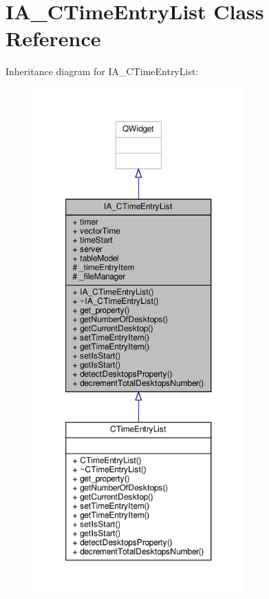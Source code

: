 \hypertarget{classIA__CTimeEntryList}{}\section{I\+A\+\_\+\+C\+Time\+Entry\+List Class Reference}
\label{classIA__CTimeEntryList}


Inheritance diagram for I\+A\+\_\+\+C\+Time\+Entry\+List\+:
\nopagebreak
\begin{figure}[H]
\begin{center}
\leavevmode
\includegraphics[height=550pt]{classIA__CTimeEntryList__inherit__graph}
\end{center}
\end{figure}


